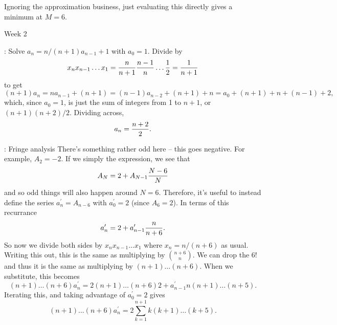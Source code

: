 \vskip 0.08in \hfil\break
Ignoring the approximation business, just evaluating this
directly gives a minimum at $M = 6$.

\vskip 0.3in
\centerline {Week 2}
\vskip 0.2in

: Solve $a_n = n / \left(n+1\right) a_{n-1} + 1$ with 
$a_0 = 1$.\hfil\break
Divide by 
$$
 x_n x_{n-1} \ldots x_1 = {n \over n + 1} {n - 1 \over n} \ldots {1 \over 2} = {1 \over n + 1}
$$
to get
$$
 \left(n + 1\right) a_n = n a_{n-1} + \left(n + 1\right)
  = \left(n - 1\right) a_{n-2} + \left(n + 1\right) + n = a_0 + \left(n+1\right) + n +
  \left(n - 1\right) + 2,
$$
which, since $a_0 = 1$, is just the sum of integers from 1 to $n+1$, or
$\left(n + 1\right)\left(n + 2\right) / 2$.  Dividing across,
$$ 
 a_n = {n + 2 \over 2}.
$$

\vskip 0.08in : Fringe analysis\hfil\break
There's something rather odd here -- this goes negative.  For example,
$A_2 = -2$.  If we simply the expression, we see that
$$
 A_N = 2 + A_{N-1} {N - 6 \over N}
$$
and so odd things will also happen around $N = 6$.  Therefore, it's
useful to instead define the series $a^{\prime}_n = A_{n-6}$ with
$a^{\prime}_0 = 2$ (since $A_6 = 2$).  In terms of this recurrance
$$
 a^{\prime}_n = 2 + a^{\prime}_{n-1} {n \over n + 6}.
$$
So now we divide both sides by $x_n x_{n-1} \ldots x_1$ where
$x_n = n / \left(n + 6\right)$ as usual.  Writing this out, this is 
the same as multiplying by $n + 6 \choose n$.  We can drop the $6!$
and thus it is the same as multiplying by $\left(n + 1\right)\ldots\left(n+6\right)$.
When we substitute, this becomes
$$
 \left(n+1\right)\ldots\left(n+6\right) a^{\prime}_n = 2 \left(n+1\right)\ldots
 \left(n+6\right) 2 + a^{\prime}_{n-1} n \left(n+1\right)\ldots\left(n+5\right).
$$
Iterating this, and taking advantage of $a^{\prime}_0 = 2$ gives
$$
\left(n+1\right)\ldots\left(n+6\right) a^{\prime}_n = 2 \sum_{k=1}^{n+1}
k \left(k + 1\right)\ldots\left(k+5\right).
$$

